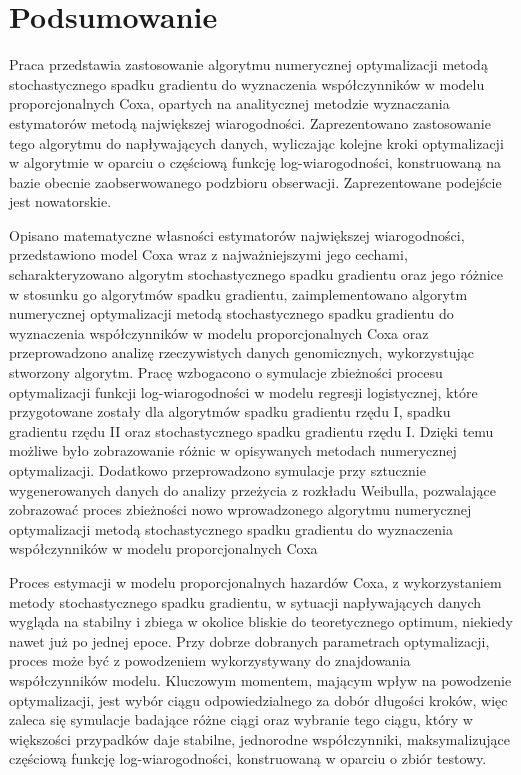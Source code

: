 \chapter*{Podsumowanie}
Praca przedstawia zastosowanie algorytmu numerycznej optymalizacji metodą stochastycznego spadku gradientu do wyznaczenia współczynników w modelu proporcjonalnych Coxa, opartych na analitycznej metodzie wyznaczania estymatorów metodą największej wiarogodności. Zaprezentowano zastosowanie tego algorytmu do napływających danych, wyliczając kolejne kroki optymalizacji w algorytmie w oparciu o częściową funkcję log-wiarogodności, konstruowaną na bazie obecnie zaobserwowanego podzbioru obserwacji. Zaprezentowane podejście jest nowatorskie.

Opisano matematyczne własności estymatorów największej wiarogodności, przedstawiono model Coxa wraz z najważniejszymi jego cechami, scharakteryzowano algorytm stochastycznego spadku gradientu oraz jego różnice w stosunku go algorytmów spadku gradientu, zaimplementowano algorytm numerycznej optymalizacji metodą stochastycznego spadku gradientu do wyznaczenia współczynników w modelu proporcjonalnych Coxa oraz przeprowadzono analizę rzeczywistych danych genomicznych, wykorzystując stworzony algorytm. Pracę wzbogacono o symulacje zbieżności procesu optymalizacji funkcji log-wiarogodności w modelu regresji logistycznej, które przygotowane zostały dla algorytmów spadku gradientu rzędu I, spadku gradientu rzędu II oraz stochastycznego spadku gradientu rzędu I. Dzięki temu możliwe było zobrazowanie różnic w opisywanych metodach numerycznej optymalizacji. Dodatkowo przeprowadzono symulacje przy sztucznie wygenerowanych danych do analizy przeżycia z rozkładu Weibulla, pozwalające zobrazować proces zbieżności nowo wprowadzonego algorytmu numerycznej optymalizacji metodą stochastycznego spadku gradientu do wyznaczenia współczynników w modelu proporcjonalnych Coxa

Proces estymacji w modelu proporcjonalnych hazardów Coxa, z wykorzystaniem metody stochastycznego spadku gradientu, w sytuacji napływających danych wygląda na stabilny i zbiega w okolice bliskie do teoretycznego optimum, niekiedy nawet już po jednej epoce. Przy dobrze dobranych parametrach optymalizacji, proces może być z powodzeniem wykorzystywany do znajdowania współczynników modelu. Kluczowym momentem, mającym wpływ na powodzenie optymalizacji, jest wybór ciągu odpowiedzialnego za dobór długości kroków, więc zaleca się symulacje badające różne ciągi oraz wybranie tego ciągu, który w większości przypadków daje stabilne, jednorodne współczynniki, maksymalizujące częściową funkcję log-wiarogodności, konstruowaną w oparciu o zbiór testowy. 

